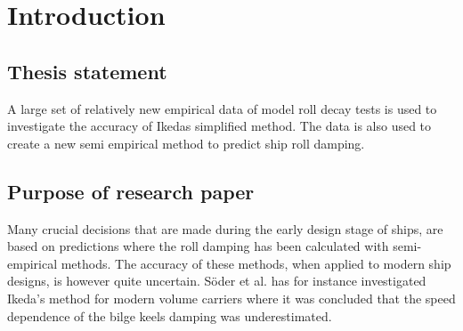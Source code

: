 \section{Introduction}
\label{se:introduction}

\subsection{Thesis statement}
A large set of relatively new empirical data of model roll decay tests is used to investigate the accuracy of Ikedas simplified method. The data is also used to create a new semi empirical method to predict ship roll damping.

\subsection{Purpose of research paper}
Many crucial decisions that are made during the early design stage of ships, are based on predictions where the roll damping has been calculated with semi-empirical methods. The accuracy of these methods, when applied to modern ship designs, is however quite uncertain. Söder et al. \cite{soder_ikeda_2019} has for instance investigated Ikeda’s method for modern volume carriers where it was concluded that the speed dependence of the bilge keels damping was underestimated.




